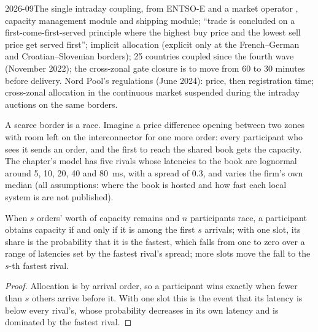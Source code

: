 \begin{dated}{2026-09}{The single intraday coupling, from ENTSO-E and a market operator}\label{dat:nw:power-commodities-and-betting-connectivity:sidc}
, capacity management module and shipping module; ``trade is concluded on a first-come-first-served principle
where the highest buy price and the lowest sell price get served first''; implicit allocation (explicit only at the French--German
and Croatian--Slovenian borders); 25 countries coupled since the fourth wave (November 2022); the cross-zonal gate closure is to move
from 60 to 30 minutes before delivery. Nord Pool's regulations (June 2024): price, then registration time; cross-zonal allocation in
the continuous market suspended during the intraday auctions on the same borders.
\end{dated}

A scarce border is a race. Imagine a price difference opening between two zones with room left on the interconnector for one more
order: every participant who sees it sends an order, and the first to reach the shared book gets the capacity. The chapter's model
has five rivals whose latencies to the book are lognormal around 5, 10, 20, 40 and \qty{80}{\milli\second}, with a spread of 0.3, and
varies the firm's own median (all assumptions: where the book is hosted and how fast each local system is are not published).

\label{lst:nw:power-commodities-and-betting-connectivity:race}

\begin{proposition}\label{prop:nw:power-commodities-and-betting-connectivity:scarce}
When $s$ orders' worth of capacity remains and $n$ participants race, a participant obtains capacity if and only if it is among the
first $s$ arrivals; with one slot, its share is the probability that it is the fastest, which falls from one to zero over a range of
latencies set by the fastest rival's spread; more slots move the fall to the $s$-th fastest rival.
\end{proposition}

\begin{proof}
Allocation is by arrival order, so a participant wins exactly when fewer than $s$ others arrive before it. With one slot this is the
event that its latency is below every rival's, whose probability decreases in its own latency and is dominated by the fastest rival.
\end{proof}

